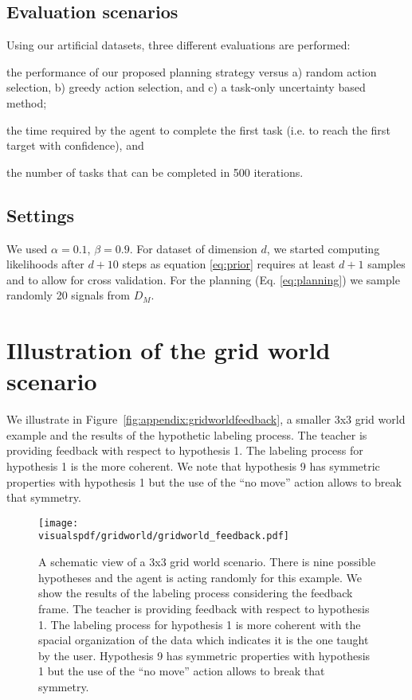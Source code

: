 \subsection{Evaluation scenarios}

Using our artificial datasets, three different evaluations are performed: \begin{inparaenum}[(i)] \item the performance of our proposed planning strategy versus a) random action selection, b) greedy action selection, and c) a task-only uncertainty based method; \item the time required by the agent to complete the first task (i.e. to reach the first target with confidence), and \item the number of tasks that can be completed in 500 iterations. \end{inparaenum}

\subsection{Settings}

We used $\alpha = 0.1$, $\beta = 0.9$. For dataset of dimension $d$, we started computing likelihoods after $d+10$ steps as equation \ref{eq:prior} requires at least $d+1$ samples and to allow for cross validation. For the planning (Eq. \ref{eq:planning}) we sample randomly 20 signals from $D_M$.

\section{Illustration of the grid world scenario}
\label{chapter:planning:gridworld}

We illustrate in Figure~\ref{fig:appendix:gridworldfeedback}, a smaller 3x3 grid world example and the results of the hypothetic labeling process. The teacher is providing feedback with respect to hypothesis 1. The labeling process for hypothesis 1 is the more coherent. We note that hypothesis 9 has symmetric properties with hypothesis 1 but the use of the ``no move'' action allows to break that symmetry.

\begin{figure}[!htbp]
  \centering
  \texttt{[image: \\visualspdf/gridworld/gridworld\_feedback.pdf]}
  \caption{A schematic view of a 3x3 grid world scenario. There is nine possible hypotheses and the agent is acting randomly for this example. We show the results of the labeling process considering the feedback frame. The teacher is providing feedback with respect to hypothesis 1. The labeling process for hypothesis 1 is more coherent with the spacial organization of the data which indicates it is the one taught by the user. Hypothesis 9 has symmetric properties with hypothesis 1 but the use of the ``no move'' action allows to break that symmetry.}
  \label{fig:planning:gridworldfeedback}
\end{figure}

